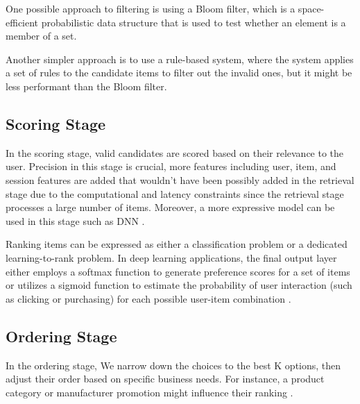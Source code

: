 One possible approach to filtering is using a Bloom filter, which is a space-efficient probabilistic data structure that is used to test whether an element is a member of a set.

Another simpler approach is to use a rule-based system, where the system applies a set of rules to the candidate items to filter out the invalid ones, but it might be less performant than the Bloom filter.


\subsection{Scoring Stage}

In the scoring stage, valid candidates are scored based on their relevance to the user. Precision in this stage is crucial, more features including user, item, and session features are added that wouldn't have been possibly added in the retrieval stage due to the computational and latency constraints since the retrieval stage processes a large number of items. Moreover, a more expressive model can be used in this stage such as DNN \cite{eugeneyan}. 

Ranking items can be expressed as either a classification problem or a dedicated learning-to-rank problem. In deep learning applications, the final output layer either employs a softmax function to generate preference scores for a set of items or utilizes a sigmoid function to estimate the probability of user interaction (such as clicking or purchasing) for each possible user-item combination \cite{eugeneyan}. 

\subsection{Ordering Stage}
In the ordering stage, We narrow down the choices to the best K options, then adjust their order based on specific business needs. For instance, a product category or manufacturer promotion might influence their ranking \cite{NvidiaRecSysBestPractices}.
